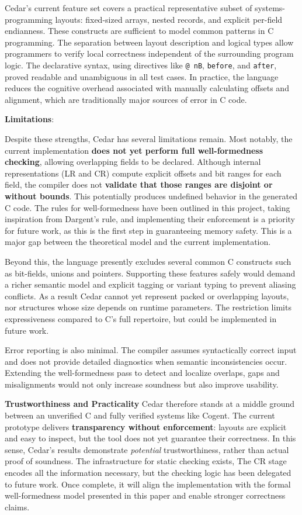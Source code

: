 Cedar's current feature set covers a practical representative
subset of systems-programming layouts: fixed-sized arrays,
nested records, and explicit per-field endianness. These
constructs are sufficient to model common patterns in C programming.
The separation between layout description and logical types allow
programmers to verify local correctness independent of the surrounding
program logic. The declarative syntax, using directives like \texttt{@ nB},
\texttt{before}, and \texttt{after}, proved readable and unambiguous in all test
cases.
In practice, the language reduces the cognitive overhead associated
with manually calculating offsets and alignment, which are traditionally
major sources of error in C code.

\textbf{Limitations}:

Despite these strengths, Cedar has several limitations remain.
Most notably, the current implementation \textbf{does not yet
perform full well-formedness checking}, allowing overlapping
fields to be declared. Although internal representations (LR and CR)
compute explicit offsets and bit ranges for each field, the compiler does not
\textbf{validate that those ranges are disjoint or without bounds}.
This potentially produces undefined behavior in the generated C code.
The rules for well-formedness have been outlined in this project,
taking inspiration from Dargent's rule, and implementing their
enforcement is a priority for future work, as this
is the first step in guaranteeing memory safety.
This is a major gap between the theoretical model and the current implementation.

Beyond this, the language presently excludes several common C constructs such as
bit-fields, unions and pointers. Supporting these features safely would demand
a richer semantic model and explicit tagging or variant typing to prevent
aliasing conflicts. As a result Cedar cannot yet represent packed or overlapping
layouts, nor structures whose size depends on runtime parameters. The restriction
limits expressiveness compared to C's full repertoire, but could be
implemented in future work.

Error reporting is also minimal. The compiler assumes syntactically correct
input and does not provide detailed diagnostics when semantic inconsistencies
occur. Extending the well-formedness pass to detect and localize overlaps, gaps
and misalignments would not only increase soundness
but also improve usability.

\textbf{Trustworthiness and Practicality}
Cedar therefore stands at a middle ground between an unverified C
and fully verified systems like Cogent. The current prototype delivers
\textbf{transparency without enforcement}: layouts are explicit and easy to
inspect,
but the tool does not yet guarantee their correctness. In this sense, Cedar's
results demonstrate \textit{potential} trustworthiness, rather
than actual proof of soundness. The infrastructure for static checking exists,
The CR stage encodes all the information necessary, but the checking
logic has been delegated to future work. Once complete, it will align
the implementation with the formal well-formedness model presented in this paper
and enable stronger correctness claims.

